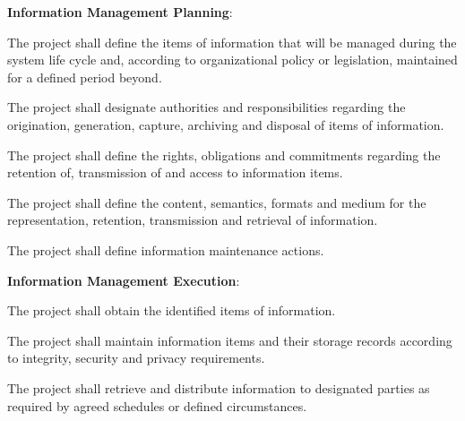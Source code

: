 			\begin{adjustwidth}{2em}{0pt} 

				\begin{compactenum}

					\item {\bf Information Management Planning}:

					\begin{compactenum}

						\item The project shall define the items of information that will be managed during the system life cycle and, according to organizational policy or legislation, maintained for a defined period beyond.

						\item The project shall designate authorities and responsibilities regarding the origination, generation, capture, archiving and disposal of items of information.

						\item The project shall define the rights, obligations and commitments regarding the retention of, transmission of and access to information items.

						\item The project shall define the content, semantics, formats and medium for the representation, retention, transmission and retrieval of information.

						\item  The project shall define information maintenance actions. 

					\end{compactenum}

					\item {\bf Information Management Execution}:

					\begin{compactenum}

						\item The project shall obtain the identified items of information.

						\item The project shall maintain information items and their storage records according to integrity, security and privacy requirements.

						\item The project shall retrieve and distribute information to designated parties as required by agreed schedules or defined circumstances.


\end{compactenum}
\end{compactenum}
\end{adjustwidth}

